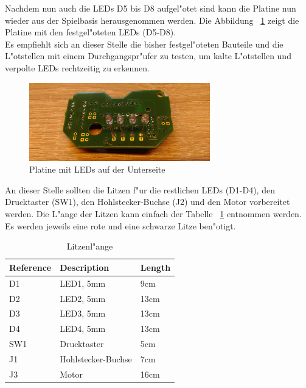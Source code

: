 Nachdem nun auch die LEDs D5 bis D8 aufgel"otet sind kann die Platine nun wieder aus der Spielbasis herausgenommen werden. Die Abbildung ~\ref{fig20} zeigt die Platine mit den festgel"oteten LEDs (D5-D8). \\
Es empfiehlt sich an dieser Stelle die bisher festgel"oteten Bauteile und die L"otstellen mit einem Durchgangspr"ufer zu testen, um kalte L"otstellen und verpolte LEDs rechtzeitig zu erkennen.

\vspace{1cm}
\begin{figure}[!ht]
	\centering
  	\includegraphics[width=0.7\textwidth]{pictures/loolou_020.jpg}
	\caption{Platine mit LEDs auf der Unterseite}
	\label{fig20}
\end{figure}
\vspace{0.5cm}

An dieser Stelle sollten die Litzen f"ur die restlichen LEDs (D1-D4), den Drucktaster (SW1), den Hohlstecker-Buchse (J2) und den Motor vorbereitet werden. Die L"ange der Litzen kann einfach der Tabelle ~\ref{table:cable} entnommen werden. Es werden jeweils eine rote und eine schwarze Litze ben"otigt.

\vspace{1cm}
\begin{table}[ht]
	\centering

	\begin{tabular}{ | l | l | l | } 
		\hline %
		Reference	& Description		& Length \\ 
		\hline \hline
		D1		& LED1, 5mm		& 9cm  \\
		\hline
		D2		& LED2, 5mm		& 13cm \\
		\hline
		D3		& LED3, 5mm		& 13cm \\
		\hline
		D4		& LED4, 5mm		& 13cm \\
		\hline
		SW1		& Drucktaster		& 5cm  \\
		\hline
		J1		& Hohlstecker-Buchse	& 7cm  \\
		\hline
		J3		& Motor			& 16cm \\
		\hline
	\end{tabular}

	\caption{Litzenl"ange}
	\label{table:cable}
\end{table}
\vspace{0.5cm}

